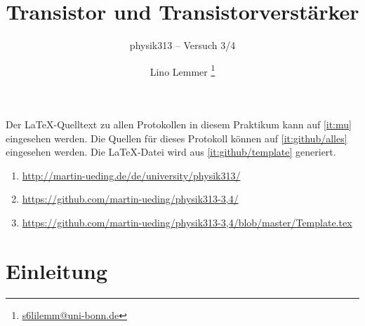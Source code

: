 


\usepackage{placeins}



\subject{Praktikumsprotokoll}
\title{Transistor und Transistorverstärker}
\subtitle{physik313 – Versuch 3/4}
\author{
	Lino Lemmer \footnote{\href{mailto:s6lilemm@uni-bonn.de}{s6lilemm@uni-bonn.de}}
}




\maketitle

Der \LaTeX-Quelltext zu allen Protokollen in diesem Praktikum kann auf
\ref{it:mu} eingesehen werden. Die Quellen für dieses Protokoll können auf
\ref{it:github/alles} eingesehen werden. Die \LaTeX-Datei wird aus
\ref{it:github/template} generiert.

\begin{enumerate}
	\item
		\label{it:mu}
		\url{http://martin-ueding.de/de/university/physik313/}
	\item
		\label{it:github/alles}
		\url{https://github.com/martin-ueding/physik313-3,4/}
	\item
		\label{it:github/template}
		\url{https://github.com/martin-ueding/physik313-3,4/blob/master/Template.tex}
\end{enumerate}

\newpage
\tableofcontents
\newpage


\FloatBarrier
\section{Einleitung}



